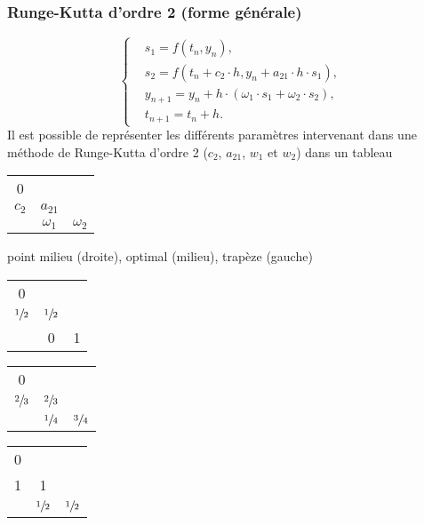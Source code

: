 \subsubsection*{Runge-Kutta d'ordre 2 (forme générale)}
\noindent
\begin{equation}
    \left\{
    \begin{aligned}
         & s_1     = f(t_n,y_n),                                              \\
         & s_2     = f\left(t_n+c_2\cdot h,y_n+a_{21}\cdot h\cdot s_1\right), \\
         & y_{n+1} = y_n+h\cdot (\omega_1\cdot s_1 + \omega_2\cdot s_2),      \\
         & t_{n+1} = t_n+h.
    \end{aligned}
    \right.
    \nonumber
\end{equation}
Il est possible de représenter les différents paramètres intervenant dans une méthode
de Runge-Kutta d'ordre 2 ($c_2$, $a_21$, $w_1$ et $w_2$) dans un tableau
\begin{center}
    \begin{tabular}{c|c c}
        0     &            &            \\
        $c_2$ & $a_{21}$                \\
        \hline
              & $\omega_1$ & $\omega_2$
    \end{tabular}
\end{center}
point milieu (droite), optimal (milieu), trapèze (gauche)
\begin{center}
    \begin{tabular}{c|c c}
        0              &                &   \\
        $\sfrac{1}{2}$ & $\sfrac{1}{2}$ &   \\
        \hline
                       & 0              & 1
    \end{tabular}
    \begin{tabular}{c|c c}
        0              &                &                \\
        $\sfrac{2}{3}$ & $\sfrac{2}{3}$ &                \\
        \hline
                       & $\sfrac{1}{4}$ & $\sfrac{3}{4}$
    \end{tabular}
    \begin{tabular}{c|c c}
        0 &                &                \\
        1 & 1              &                \\
        \hline
          & $\sfrac{1}{2}$ & $\sfrac{1}{2}$
    \end{tabular}
\end{center}
